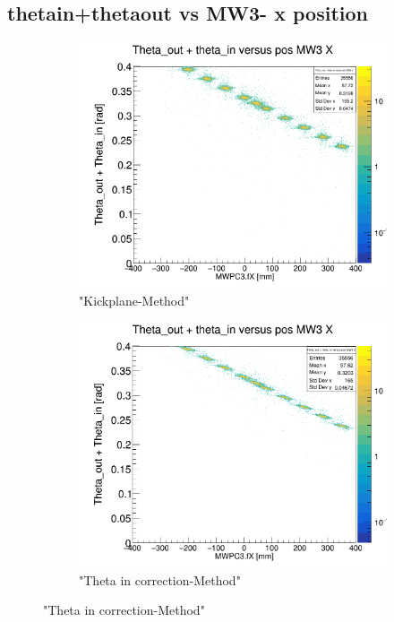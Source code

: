 \documentclass[12pt, letterpaper]{article}
\begin{document}
\subsection{theta\textunderscore in+theta\textunderscore out vs MW3- x position }
\begin{figure}[!htbp]
\begin{subfigure}{.5\textwidth}
  \centering
  \includegraphics[width=.9\linewidth]{plot_imgs/theta_out_theta_in_mw3_get_centr.png}  
  \caption{"Kickplane-Method"}
  \label{fig:sub-first}
\end{subfigure}
\begin{subfigure}{.5\textwidth}
  \centering
  \includegraphics[width=.9\linewidth]{plot_imgs/theta_out_theta_in_mw3_corr.png} 
  \caption{"Theta \textunderscore in correction-Method"}

\end{subfigure}
\end{figure}
\end{document}
